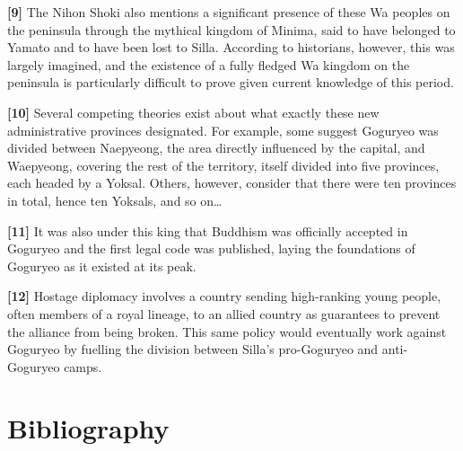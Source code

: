 \documentclass[11pt,a4paper]{article}
\begin{document}
\textbf{{[}9{]}} The Nihon Shoki also mentions a significant presence of these Wa peoples on the peninsula through the mythical kingdom of Minima, said to have belonged to Yamato and to have been lost to Silla. According to historians, however, this was largely imagined, and the existence of a fully fledged Wa kingdom on the peninsula is particularly difficult to prove given current knowledge of this period.

\textbf{{[}10{]}} Several competing theories exist about what exactly these new administrative provinces designated. For example, some suggest Goguryeo was divided between Naepyeong, the area directly influenced by the capital, and Waepyeong, covering the rest of the territory, itself divided into five provinces, each headed by a Yoksal. Others, however, consider that there were ten provinces in total, hence ten Yoksals, and so on\ldots{}

\textbf{{[}11{]}} It was also under this king that Buddhism was officially accepted in Goguryeo and the first legal code was published, laying the foundations of Goguryeo as it existed at its peak.

\textbf{{[}12{]}} Hostage diplomacy involves a country sending high-ranking young people, often members of a royal lineage, to an allied country as guarantees to prevent the alliance from being broken. This same policy would eventually work against Goguryeo by fuelling the division between Silla's pro-Goguryeo and anti-Goguryeo camps.

\section{Bibliography}
\small
\end{document}
